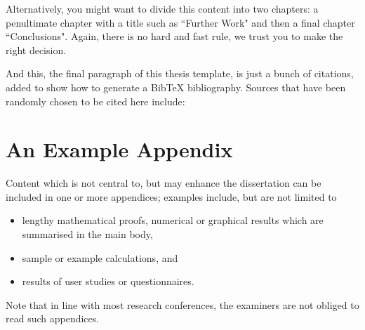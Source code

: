 \documentclass[ %
                    author={Carlos Duran Calle},
                supervisor={Dr. Felipe Campelo},
                    degree={MSc},
                     title={Comparative Machine Learning Analysis for Student Dropout Prediction in a Virtual Learning Environment},
                  subtitle={Incorporating Student Engagement and Socio-Economic Features},
                      type={},
                      year={2025}]{dissertation}
\begin{document}
Alternatively, you might want to divide this content into two chapters: a penultimate chapter with a title such as ``Further Work" and then a final chapter ``Conclusions". Again, there is no hard and fast rule, we trust you to make the right decision. 

And this, the final paragraph of this thesis template, is just a bunch of citations, added to show how to generate a BibTeX bibliography. Sources that have been randomly chosen to be cited here include:





%
%

\backmatter

%




\appendix

\chapter{An Example Appendix}
\label{appx:example}

Content which is not central to, but may enhance the dissertation can be 
included in one or more appendices; examples include, but are not limited
to

\begin{itemize}
\item lengthy mathematical proofs, numerical or graphical results which 
      are summarised in the main body,
\item sample or example calculations, 
      and
\item results of user studies or questionnaires.
\end{itemize}

\noindent
Note that in line with most research conferences, the examiners are not
obliged to read such appendices.

\end{document}
